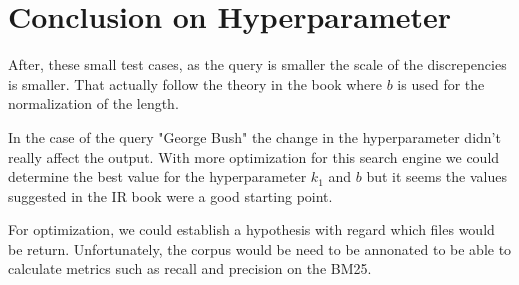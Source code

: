 \section{Conclusion on Hyperparameter}

\par After, these small test cases, as the query is smaller the scale of the discrepencies is smaller. That actually follow the theory in the book where $b$ is used for the normalization of the length.
\par In the case of the query "George Bush" the change in the hyperparameter didn't really affect the output. With more optimization for this search engine we could determine the best value for the hyperparameter $k_1$ and $b$ but it seems the values suggested in the IR book \cite{k-values} were a good starting point.
\par For optimization, we could establish a hypothesis with regard which files would be return. Unfortunately, the corpus would be need to be annonated to be able to calculate metrics such as recall and precision on the BM25.